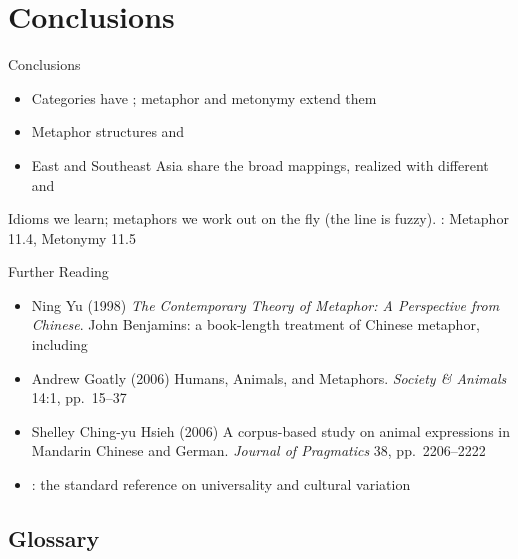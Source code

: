 \documentclass{beamer}
\begin{document}
\section{Conclusions}

\begin{frame}{Conclusions}
  \Large
  \begin{itemize}
  \item Categories have ; metaphor and metonymy extend them
  \item Metaphor structures  and 
  \item East and Southeast Asia share the broad mappings, realized with
    different  and 
  \end{itemize}
  \vfill
  \normalsize
  Idioms we learn; metaphors we work out on the fly (the line is fuzzy).
  \citet{saeed:2015}: Metaphor 11.4, Metonymy 11.5
\end{frame}

\begin{frame}{Further Reading}
\begin{itemize}
\item Ning Yu (1998) \textit{The Contemporary Theory of Metaphor: A
    Perspective from Chinese}. John Benjamins: a book-length treatment
  of Chinese metaphor, including 
\item Andrew Goatly (2006) Humans, Animals, and Metaphors.
  \textit{Society \& Animals} 14:1, pp.\ 15--37
\item Shelley Ching-yu Hsieh (2006) A corpus-based study on animal
  expressions in Mandarin Chinese and German. \textit{Journal of
    Pragmatics} 38, pp.\ 2206--2222
\item \citet{kovecses2005metaphor}: the standard reference on
  universality and cultural variation
\end{itemize}
\end{frame}

\subsection*{Glossary}
\end{document}
